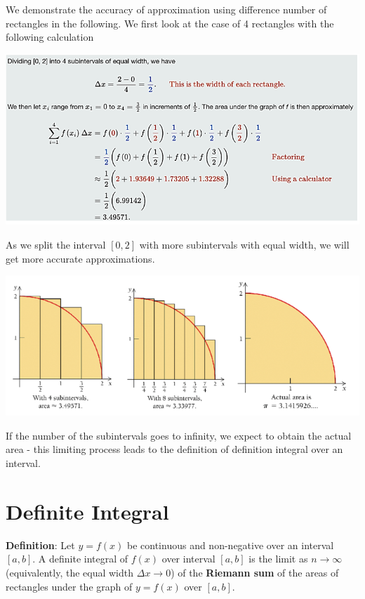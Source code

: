 \documentclass[
]{book}
\begin{document}
We demonstrate the accuracy of approximation using difference number of rectangles in the following. We first look at the case of 4 rectangles with the following calculation

\begin{center}\includegraphics[width=0.95\linewidth]{img12/QuarterCircle4Rectangles} \end{center}

As we split the interval \([0,2]\) with more subintervals with equal width, we will get more accurate approximations.

\begin{center}\includegraphics[width=0.85\linewidth]{img12/MoreCorcleApprox} \end{center}

If the number of the subintervals goes to infinity, we expect to obtain the actual area - this limiting process leads to the definition of definition integral over an interval.

\hfill\break

\hypertarget{definite-integral-1}{%
\section{Definite Integral}\label{definite-integral-1}}

\textbf{Definition}: Let \(y = f(x)\) be continuous and non-negative over an interval \([a, b]\). A definite integral of \(f(x)\) over interval \([a, b]\) is the limit as \(n \to \infty\) (equivalently, the equal width \(\Delta x \to 0\)) of the \textbf{Riemann sum} of the areas of rectangles under the graph of \(y = f(x)\) over \([a,b]\).
\end{document}
